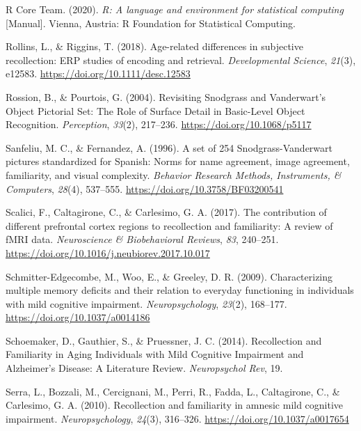\documentclass[
  11pt,
]{article}
\begin{document}
\leavevmode\hypertarget{ref-rcoreteam2020}{}%
R Core Team. (2020). \emph{R: A language and environment for statistical
computing} {[}Manual{]}. Vienna, Austria: R Foundation for Statistical
Computing.

\leavevmode\hypertarget{ref-rollins2018}{}%
Rollins, L., \& Riggins, T. (2018). Age-related differences in
subjective recollection: ERP studies of encoding and retrieval.
\emph{Developmental Science}, \emph{21}(3), e12583.
\url{https://doi.org/10.1111/desc.12583}

\leavevmode\hypertarget{ref-rossion2004}{}%
Rossion, B., \& Pourtois, G. (2004). Revisiting Snodgrass and
Vanderwart's Object Pictorial Set: The Role of Surface Detail in
Basic-Level Object Recognition. \emph{Perception}, \emph{33}(2),
217--236. \url{https://doi.org/10.1068/p5117}

\leavevmode\hypertarget{ref-sanfeliu1996}{}%
Sanfeliu, M. C., \& Fernandez, A. (1996). A set of 254
Snodgrass-Vanderwart pictures standardized for Spanish: Norms for name
agreement, image agreement, familiarity, and visual complexity.
\emph{Behavior Research Methods, Instruments, \& Computers},
\emph{28}(4), 537--555. \url{https://doi.org/10.3758/BF03200541}

\leavevmode\hypertarget{ref-scalici2017}{}%
Scalici, F., Caltagirone, C., \& Carlesimo, G. A. (2017). The
contribution of different prefrontal cortex regions to recollection and
familiarity: A review of fMRI data. \emph{Neuroscience \& Biobehavioral
Reviews}, \emph{83}, 240--251.
\url{https://doi.org/10.1016/j.neubiorev.2017.10.017}

\leavevmode\hypertarget{ref-schmitter-edgecombe2009}{}%
Schmitter-Edgecombe, M., Woo, E., \& Greeley, D. R. (2009).
Characterizing multiple memory deficits and their relation to everyday
functioning in individuals with mild cognitive impairment.
\emph{Neuropsychology}, \emph{23}(2), 168--177.
\url{https://doi.org/10.1037/a0014186}

\leavevmode\hypertarget{ref-schoemaker2014}{}%
Schoemaker, D., Gauthier, S., \& Pruessner, J. C. (2014). Recollection
and Familiarity in Aging Individuals with Mild Cognitive Impairment and
Alzheimer's Disease: A Literature Review. \emph{Neuropsychol Rev}, 19.

\leavevmode\hypertarget{ref-serra2010}{}%
Serra, L., Bozzali, M., Cercignani, M., Perri, R., Fadda, L.,
Caltagirone, C., \& Carlesimo, G. A. (2010). Recollection and
familiarity in amnesic mild cognitive impairment.
\emph{Neuropsychology}, \emph{24}(3), 316--326.
\url{https://doi.org/10.1037/a0017654}
\end{document}
